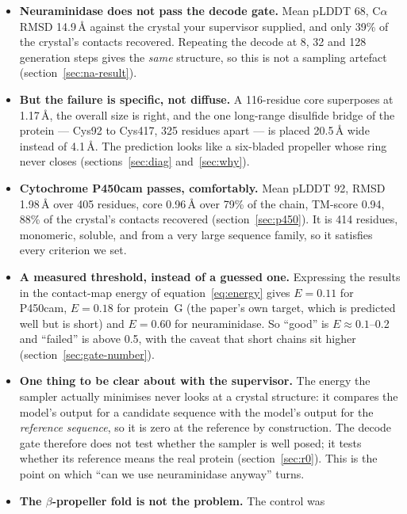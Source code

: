 \documentclass[11pt,a4paper]{article}
\begin{document}
\begin{itemize}
  \item \textbf{Neuraminidase does not pass the decode gate.} Mean pLDDT 68,
        C$\alpha$ RMSD 14.9\,\AA{} against the crystal your supervisor supplied,
        and only 39\% of the crystal's contacts recovered. Repeating the decode
        at 8, 32 and 128 generation steps gives the \emph{same} structure, so
        this is not a sampling artefact (section~\ref{sec:na-result}).
  \item \textbf{But the failure is specific, not diffuse.} A 116-residue core
        superposes at 1.17\,\AA, the overall size is right, and the one
        long-range disulfide bridge of the protein --- Cys92 to Cys417, 325
        residues apart --- is placed 20.5\,\AA{} wide instead of 4.1\,\AA. The
        prediction looks like a six-bladed propeller whose ring never closes
        (sections~\ref{sec:diag} and~\ref{sec:why}).
  \item \textbf{Cytochrome P450cam passes, comfortably.} Mean pLDDT 92, RMSD
        1.98\,\AA{} over 405 residues, core 0.96\,\AA{} over 79\% of the chain,
        TM-score 0.94, 88\% of the crystal's contacts recovered
        (section~\ref{sec:p450}). It is 414 residues, monomeric, soluble, and
        from a very large sequence family, so it satisfies every criterion we
        set.
  \item \textbf{A measured threshold, instead of a guessed one.} Expressing the
        results in the contact-map energy of equation~\eqref{eq:energy} gives
        $E = 0.11$ for P450cam, $E = 0.18$ for protein~G (the paper's own target,
        which is predicted well but is short) and $E = 0.60$ for neuraminidase.
        So ``good'' is $E \approx 0.1$--0.2 and ``failed'' is above 0.5, with the
        caveat that short chains sit higher (section~\ref{sec:gate-number}).
  \item \textbf{One thing to be clear about with the supervisor.} The energy the
        sampler actually minimises never looks at a crystal structure: it
        compares the model's output for a candidate sequence with the model's
        output for the \emph{reference sequence}, so it is zero at the reference
        by construction. The decode gate therefore does not test whether the
        sampler is well posed; it tests whether its reference means the real
        protein (section~\ref{sec:r0}). This is the point on which ``can we use
        neuraminidase anyway'' turns.
  \item \textbf{The $\beta$-propeller fold is not the problem.} The control was

\end{itemize}
\end{document}
